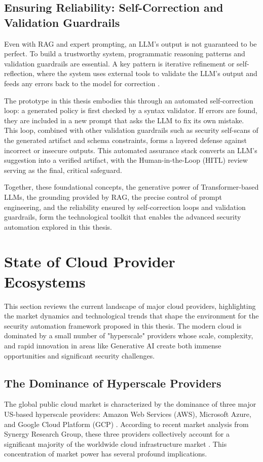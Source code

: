 \subsection{Ensuring Reliability: Self-Correction and Validation Guardrails}
Even with RAG and expert prompting, an LLM's output is not guaranteed to be perfect. To build a trustworthy system, programmatic reasoning patterns and validation guardrails are essential. A key pattern is iterative refinement or self-reflection, where the system uses external tools to validate the LLM's output and feeds any errors back to the model for correction \cite{vaswani_attention_2023}.

The prototype in this thesis embodies this through an automated self-correction loop: a generated policy is first checked by a syntax validator. If errors are found, they are included in a new prompt that asks the LLM to fix its own mistake. This loop, combined with other validation guardrails such as security self-scans of the generated artifact and schema constraints, forms a layered defense against incorrect or insecure outputs. This automated assurance stack converts an LLM's suggestion into a verified artifact, with the Human-in-the-Loop (HITL) review serving as the final, critical safeguard.

Together, these foundational concepts, the generative power of Transformer-based LLMs, the grounding provided by RAG, the precise control of prompt engineering, and the reliability ensured by self-correction loops and validation guardrails, form the technological toolkit that enables the advanced security automation explored in this thesis.


\section{State of Cloud Provider Ecosystems}
\label{sec:cloud_ecosystems}

This section reviews the current landscape of major cloud providers, highlighting the market dynamics and technological trends that shape the environment for the security automation framework proposed in this thesis. The modern cloud is dominated by a small number of "hyperscale" providers whose scale, complexity, and rapid innovation in areas like Generative AI create both immense opportunities and significant security challenges.

\subsection{The Dominance of Hyperscale Providers}
The global public cloud market is characterized by the dominance of three major US-based hyperscale providers: Amazon Web Services (AWS), Microsoft Azure, and Google Cloud Platform (GCP) \cite{n_koritala_cloud-first_2025}. According to recent market analysis from Synergy Research Group, these three providers collectively account for a significant majority of the worldwide cloud infrastructure market \cite{noauthor_european_nodate}. This concentration of market power has several profound implications.

